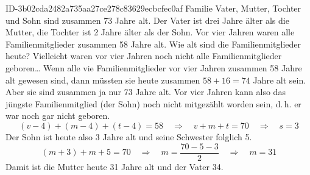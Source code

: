 \begin{exercise}
      {ID-3b02cda2482a735aa27ce278c83629ecbcfec0af}
      {Familie}
  \ifproblem\problem
    Vater, Mutter, Tochter und Sohn sind zusammen 73 Jahre alt.
    Der Vater ist drei Jahre älter als die Mutter, die Tochter
    ist 2 Jahre älter als der Sohn. Vor vier Jahren waren
    alle Familienmitglieder zusammen 58 Jahre alt.
    Wie alt sind die Familienmitglieder heute?
  \fi
  \ifoutline\outline
    Vielleicht waren vor vier Jahren noch nicht alle Familienmitglieder geboren\ldots
  \fi
  \ifoutcome\outcome
    Wenn alle vie Familienmitglieder vor vier Jahren zusammen
    58 Jahre alt gewesen sind, dann müssten sie heute zusammen
    $58+16=74$ Jahre alt sein. Aber sie sind zusammen ja nur
    73 Jahre alt. Vor vier Jahren kann also das jüngste
    Familienmitglied (der Sohn) noch nicht mitgezählt worden
    sein, d.\,h. er war noch gar nicht geboren.
    \begin{equation*}
      (v-4)+(m-4)+(t-4)=58\quad\Rightarrow\quad v+m+t=70\quad\Rightarrow\quad s=3
    \end{equation*}
    Der Sohn ist heute also 3 Jahre alt und seine Schwester folglich 5.
    \begin{equation*}
      (m+3)+m+5=70\quad\Rightarrow\quad m=\frac{70-5-3}{2}\quad\Rightarrow\quad m=31
    \end{equation*}
    Damit ist die Mutter heute 31 Jahre alt und der Vater 34.
  \fi
\end{exercise}
